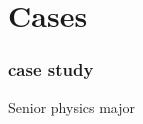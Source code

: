 \section{Cases}
\begin{comment}
* Cases
** Case study: Scientific Computing (we know this target exists)
*** Target user: a senior physics major who knows some C, and wants to either 1) contribute to a project or 2) do some research and feed it back into a community
*** Write wiki articles instead of writing a paper.
*** http://www.scipy.org/Getting_Started
*** http://www.opensourcephysics.org/
**** Extend with projects that run on the EC2 compute cloud / GPGPUs
*** Automation of experiments / Arduino
\end{comment}



\begin{frame} 
\frametitle{case study}
\huge
\begin{center}
Senior physics major
\end{center}
\end{frame} 



\begin{comment}
\begin{frame} 
\frametitle{What could this student do?}
\begin{itemize}
	\item Search: "Scientific computing"
	\item http://www.scipy.org/Getting_Started
	\item http://www.opensourcephysics.org
	\item Write wiki articles instead of writing a paper.
	\item Extend to EC2 and GPGPUs
	\item Automation of experiments (Arduino?)
	\item other ideas?
\end{itemize}
\end{frame}
\end{comment}
